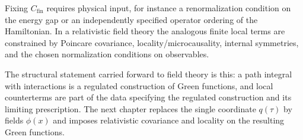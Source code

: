 Fixing \(C_{\mathrm{fin}}\) requires physical input, for instance a
renormalization condition on the energy gap or an independently specified
operator ordering of the Hamiltonian.  In a relativistic field theory the
analogous finite local terms are constrained by Poincare covariance,
locality/microcausality, internal symmetries, and the chosen normalization
conditions on observables.

The structural statement carried forward to field theory is this: a path
integral with interactions is a regulated construction of Green functions,
and local counterterms are part of the data specifying the regulated
construction and its limiting prescription. The next chapter replaces the
single coordinate \(q(\tau)\) by fields \(\phi(x)\) and imposes relativistic
covariance and locality on the resulting Green functions.

